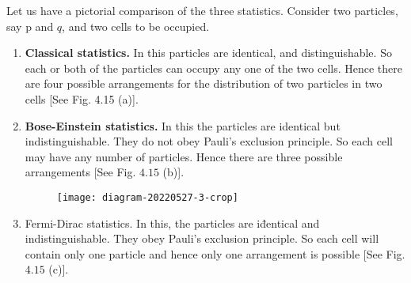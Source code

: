 \par Let us have a pictorial comparison of the three statistics. Consider two particles, say p and $q$, and two cells to be occupied.
\begin{enumerate}
	\item  \textbf{Classical statistics.} In this particles are identical, and distinguishable. So each or both of the particles can occupy any one of the two cells. Hence there are four possible arrangements for the distribution of two particles in two cells [See Fig. 4.15 (a)].\\
	\item  \textbf{Bose-Einstein statistics.} In this the particles are identical but indistinguishable. They do not obey Pauli's exclusion principle. So each cell may have any number of particles. Hence there are three possible arrangements [See Fig. $4.15$ (b)].
	\begin{figure}[H]
		\centering
		\texttt{[image: diagram-20220527-3-crop]}
	\end{figure}
	\item  Fermi-Dirac statistics. In this, the particles are iđentical and indistinguishable. They obey Pauli's exclusion principle. So each cell will contain only one particle and hence only one arrangement is possible [See Fig. $4.15$ (c)].
\end{enumerate}
